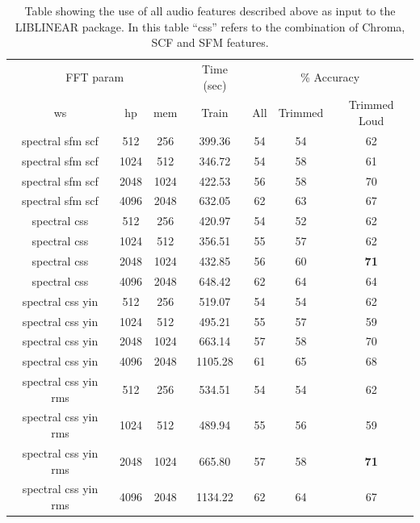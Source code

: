 \documentclass[12pt,oneside]{book}
\begin{document}
\begin{table}
\begin{tabular}{|c|c|c|c|c|c|c|}
\hline
\multicolumn{3}{|c|}{FFT param} & \multicolumn{1}{c|}{Time (sec)} & \multicolumn{3}{c|}{\% Accuracy} \\
\hhline{|-|-|-|-|-|-|-|}
ws & hp & mem & Train & All & Trimmed & Trimmed Loud \\
\hhline{|=|=|=|=|=|=|=|}
spectral sfm scf & 512 & 256         &   399.36  &    54 & 54 & 62 \\
spectral sfm scf & 1024 & 512        &   346.72  &    54 & 58 & 61 \\
spectral sfm scf & 2048 & 1024       &   422.53  &    56 & 58 & 70 \\
spectral sfm scf & 4096 & 2048       &   632.05  &    62 & 63 & 67 \\
\hline
spectral css & 512 & 256             &   420.97  &    54 & 52 & 62 \\
spectral css & 1024 & 512   		 &   356.51  &    55 & 57 & 62 \\
spectral css & 2048 & 1024           &   432.85  &    56 & 60 & \textbf{71} \\
spectral css & 4096 & 2048           &   648.42  &    62 & 64 & 64 \\
\hline
spectral css yin & 512 & 256         &   519.07  &    54 & 54 & 62 \\
spectral css yin & 1024 & 512        &   495.21  &    55 & 57 & 59 \\
spectral css yin & 2048 & 1024       &   663.14  &    57 & 58 & 70 \\
spectral css yin & 4096 & 2048       &  1105.28  &    61 & 65 & 68 \\
\hline
spectral css yin rms & 512 & 256     &   534.51  &    54 & 54 & 62 \\
spectral css yin rms & 1024 & 512    &   489.94  &    55 & 56 & 59 \\
spectral css yin rms & 2048 & 1024   &   665.80  &    57 & 58 & \textbf{71} \\
spectral css yin rms & 4096 & 2048   &  1134.22  &    62 & 64 & 67\\
\hline
\end{tabular}
\caption{Table showing the use of all audio features
  described above as input to the LIBLINEAR package.  In this table
  ``css'' refers to the combination of Chroma, SCF and SFM features.}
\label{table:calls-different-all}
\end{table}
\end{document}

